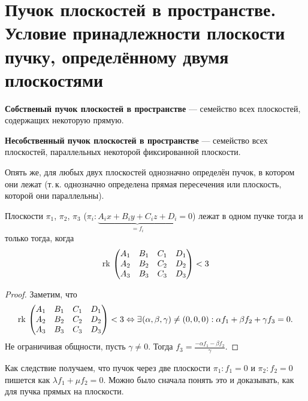 \section{Пучок плоскостей в пространстве. Условие принадлежности плоскости пучку, определённому двумя плоскостями}

\begin{definition}
    \textbf{Собственый пучок плоскостей в пространстве} --- семейство всех плоскостей, содержащих некоторую прямую.
\end{definition}

\begin{definition}
    \textbf{Несобственный пучок плоскостей в пространстве} --- семейство всех плоскостей, параллельных некоторой фиксированной плоскости.
\end{definition}

Опять же, для любых двух плоскостей однозначно определён пучок, в котором они лежат (т.\,к. однозначно определена прямая пересечения или плоскость, которой они параллельны).

\begin{statement}
    Плоскости $\pi_1$, $\pi_2$, $\pi_3$ ($\pi_i: \underbrace{A_ix + B_iy + C_iz + D_i}_{{} = f_i} = 0$) лежат в одном пучке тогда и только тогда, когда
    $$\mathrm{rk}\,
    \begin{pmatrix}
        A_1 & B_1 & C_1 & D_1\\
        A_2 & B_2 & C_2 & D_2\\
        A_3 & B_3 & C_3 & D_3
    \end{pmatrix} < 3
    $$
\end{statement}

\begin{proof}
    Заметим, что 
    $$\mathrm{rk}\,
    \begin{pmatrix}
        A_1 & B_1 & C_1 & D_1\\
        A_2 & B_2 & C_2 & D_2\\
        A_3 & B_3 & C_3 & D_3
    \end{pmatrix} < 3 \Leftrightarrow \exists\!\:(\alpha, \beta, \gamma) \ne (0, 0, 0):\alpha f_1 + \beta f_2 + \gamma f_3 = 0.
    $$
    Не ограничивая общности, пусть $\gamma \ne 0$. Тогда $\displaystyle f_3 = \frac{-\alpha f_1 - \beta f_2}{\gamma}$. 
\end{proof}

\begin{orangebox}
    Как следствие получаем, что пучок через две плоскости $\pi_1: f_1 = 0$ и $\pi_2: f_2 = 0$ пишется как
    $\lambda f_1 + \mu f_2 = 0$. Можно было сначала понять это и доказывать, как для пучка прямых на плоскости.
\end{orangebox}


